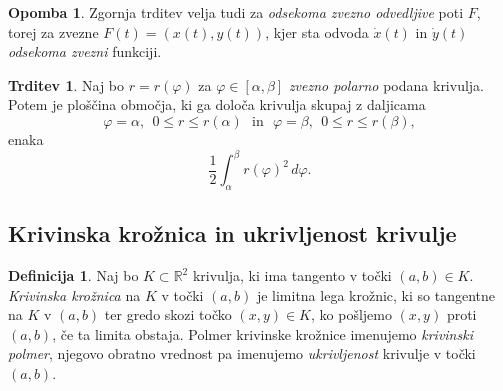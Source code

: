 \documentclass[11pt]{article}
\newcommand{\R}{\mathbb{R}}
\theoremstyle{definition}
\newtheorem{definicija}{Definicija}[section]
\theoremstyle{definition}
\newtheorem{trditev}{Trditev}[section]
\theoremstyle{definition}
\theoremstyle{theorem}
\newtheorem*{opomba}{Opomba}
\begin{document}
\begin{opomba}

Zgornja trditev velja tudi za \textit{odsekoma zvezno odvedljive} poti $F$, torej za zvezne $F(t) = (x(t), y(t))$, kjer sta odvoda $\dot{x}(t)$ in $\dot{y}(t)$ \textit{odsekoma zvezni} funkciji.

\end{opomba}
\vspace{0.5cm}

\begin{trditev}

Naj bo $r = r(\varphi)$ za $\varphi \in [\alpha, \beta]$ \textit{zvezno polarno} podana \hbox{krivulja}. Potem je ploščina območja, ki ga določa krivulja skupaj z \hbox{daljicama} 
$$\varphi = \alpha, ~~0 \leq r \leq r(\alpha) ~~~\text{in}~~~ \varphi = \beta, ~~0 \leq r \leq r(\beta),$$
enaka
$$\frac{1}{2} \int_\alpha^\beta r(\varphi)^2\,d\varphi.$$

\end{trditev}
\vspace{0.5cm}


\subsection{Krivinska krožnica in ukrivljenost krivulje}
\vspace{0.5cm}

\begin{definicija}

Naj bo $K \subset \R^2$ krivulja, ki ima tangento v točki $(a, b) \in K$. \textit{Krivinska krožnica} na $K$ v točki $(a, b)$ je limitna lega krožnic, ki so tangentne na $K$ v $(a, b)$ ter gredo skozi točko $(x, y) \in K$, ko pošljemo $(x, y)$ proti $(a, b)$, če ta limita obstaja. Polmer krivinske krožnice imenujemo \textit{krivinski polmer}, njegovo obratno vrednost pa imenujemo \textit{ukrivljenost} krivulje v točki $(a, b)$.

\end{definicija}
\vspace{0.5cm}
\end{document}
